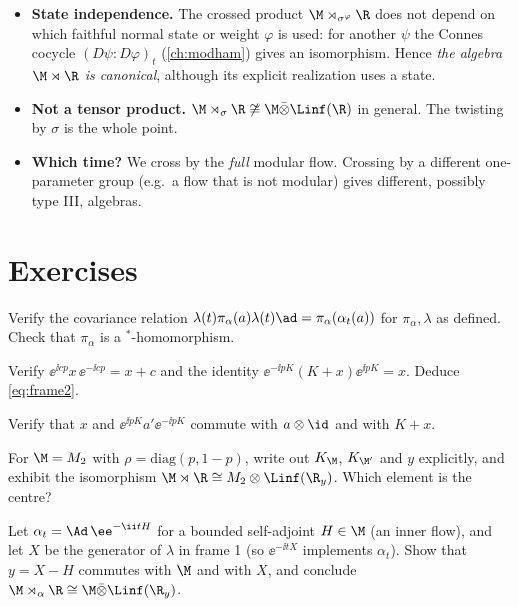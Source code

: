 \begin{whatwrong}
\begin{itemize}
\item \textbf{State independence.} The crossed product $\M\rtimes_{\sigma^\varphi}\R$ does not depend on which faithful normal state or weight $\varphi$ is used: for another $\psi$ the Connes cocycle $(D\psi:D\varphi)_t$ (\cref{ch:modham}) gives an isomorphism. Hence \emph{the algebra $\M\rtimes\R$ is canonical}, although its explicit realization uses a state.
\item \textbf{Not a tensor product.} $\M\rtimes_\sigma\R\not\cong\M\bar\otimes\Linf(\R)$ in general. The twisting by $\sigma$ is the whole point.
\item \textbf{Which time?} We cross by the \emph{full} modular flow. Crossing by a different one-parameter group (e.g.\ a flow that is not modular) gives different, possibly type III, algebras.
\end{itemize}
\end{whatwrong}

\section*{Exercises}
\begin{exercise}
Verify the covariance relation $\lambda(t)\pi_\alpha(a)\lambda(t)\ad=\pi_\alpha(\alpha_t(a))$ for $\pi_\alpha,\lambda$ as defined. Check that $\pi_\alpha$ is a $^*$-homomorphism.
\end{exercise}
\begin{exercise}
Verify $\ee^{\ii cp}x\,\ee^{-\ii cp}=x+c$ and the identity $\ee^{-\ii pK}(K+x)\ee^{\ii pK}=x$. Deduce \eqref{eq:frame2}.
\end{exercise}
\begin{exercise}
Verify that $x$ and $\ee^{\ii pK}a'\ee^{-\ii pK}$ commute with $a\otimes\id$ and with $K+x$.
\end{exercise}
\begin{exercise}
For $\M=M_2$ with $\rho=\mathrm{diag}(p,1-p)$, write out $K_\M$, $K_{\M'}$ and $y$ explicitly, and exhibit the isomorphism $\M\rtimes\R\cong M_2\otimes\Linf(\R_y)$. Which element is the centre?
\end{exercise}
\begin{exercise}
Let $\alpha_t=\Ad\,\ee^{-\ii tH}$ for a bounded self-adjoint $H\in\M$ (an inner flow), and let $X$ be the generator of $\lambda$ in frame 1 (so $\ee^{-\ii tX}$ implements $\alpha_t$). Show that $y=X-H$ commutes with $\M$ and with $X$, and conclude $\M\rtimes_\alpha\R\cong\M\bar\otimes\Linf(\R_y)$.
\end{exercise}
